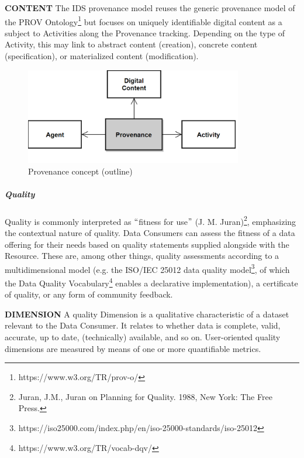 \textbf{CONTENT} The IDS provenance model reuses the generic provenance model of the PROV Ontology\footnote{ https://www.w3.org/TR/prov-o/ } but focuses on uniquely identifiable digital content as a subject to Activities along the Provenance tracking. Depending on the type of Activity, this may link to abstract content (creation), concrete content (specification), or materialized content (modification). 




\begin{figure}[H]
	\begin{Center}
		\includegraphics[width=3.74in,height=1.65in]{./media/image44.png}
		\caption{Provenance concept (outline)}
		\label{fig:Provenance_concept_outline}
	\end{Center}
\end{figure}




\subparagraph*{Quality}
Quality is commonly interpreted as $``$fitness for use$"$  (J. M. Juran)\footnote{Juran, J.M., Juran on Planning for Quality. 1988, New York: The Free Press.  }, emphasizing the contextual nature of quality. Data Consumers can assess the fitness of a data offering for their needs based on quality statements supplied alongside with the Resource. These are, among other things, quality assessments according to a multidimensional model (e.g. the ISO/IEC 25012 data quality model\footnote{https://iso25000.com/index.php/en/iso-25000-standards/iso-25012 }, of which the Data Quality Vocabulary\footnote{https://www.w3.org/TR/vocab-dqv/ } enables a declarative implementation), a certificate of quality, or any form of community feedback.


\textbf{DIMENSION} A quality Dimension is a qualitative characteristic of a dataset relevant to the Data Consumer. It relates to whether data is complete, valid, accurate, up to date, (technically) available, and so on. User-oriented quality dimensions are measured by means of one or more quantifiable metrics. 

